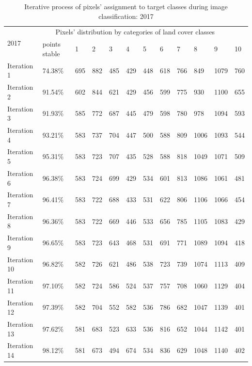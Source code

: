\documentclass[jmse,article,submit,pdftex,moreauthors]{Definitions/mdpi}
\begin{document}
\begin{table}[H]
  \centering
  \begin{tabularx}{\textwidth}{p{1.6cm}p{1.8cm}p{0.7cm}p{0.6cm}p{0.6cm}p{0.6cm}p{0.6cm}p{0.6cm}p{0.6cm}p{0.6cm}p{0.6cm}p{0.6cm}}
  \toprule
  \multirow{2}{*}{2017} & \multicolumn{10}{c}{Pixels' distribution by categories of land cover classes} \\
    & points stable & 1 & 2 &  3 & 4 & 5 & 6 & 7 & 8 & 9 & 10 \\
    \midrule
    Iteration 1 & 74.38\% & 695 & 882& 485 &429 &448& 618 & 766 & 849& 1079& 760 \\
    Iteration 2 & 91.54\% & 602 & 844 & 621 & 429 & 456 & 599 & 775 & 930 & 1100 &  655 \\
    Iteration 3 & 91.93\% & 585 & 772 & 687 & 445 &479 & 598 & 780 & 978 & 1094 & 593 \\
    Iteration 4 & 93.21\% & 583 & 737 & 704 & 447 & 500 & 588 & 809 & 1006 & 1093 &  544\\
    Iteration 5 & 95.31\% & 583 & 723 & 707 & 435 & 528 & 588 & 818 & 1049 & 1071 & 509 \\
    Iteration 6 & 96.38\% & 583 &724 & 699 & 429 & 534 & 601 & 813 &1086 &1061 & 481 \\
    Iteration 7 & 96.41\% & 583 & 722 & 688 & 433 & 531 & 622 & 806 & 1106 & 1066 & 454 \\
    Iteration 8 & 96.36\% & 583 &722 & 669 & 446 & 533 & 656& 785 & 1105 & 1083 &429 \\
    Iteration 9 & 96.65\% & 583 & 723 &643 & 468 & 531 & 691 & 771 &1089 & 1094 & 418 \\
    Iteration 10 & 96.82\% & 582 & 726 & 621 &486 &538 &723 &739 &1074  & 1113 & 409 \\
    Iteration 11 & 97.10\% & 582 & 724 & 586 &524  & 537 &757 & 708 &1060 &1129 &404 \\
     Iteration 12 & 97.39\% & 582 & 704 & 552 & 582 & 536 & 786 &682 &1047 &1139 &401 \\
     Iteration 13 & 97.62\% &  581 &683  &523 &633 &536 &816 & 652 & 1044 & 1142 &401 \\
     Iteration 14 & 98.12\% & 581 & 673 & 494 &674 &534 & 836 & 629 &1048 & 1140 &402 \\
\bottomrule
\end{tabularx}
  \caption{Iterative process of pixels' assignment to target classes during image classification: 2017}
  \label{tabB3}
\end{table}
\end{document}
